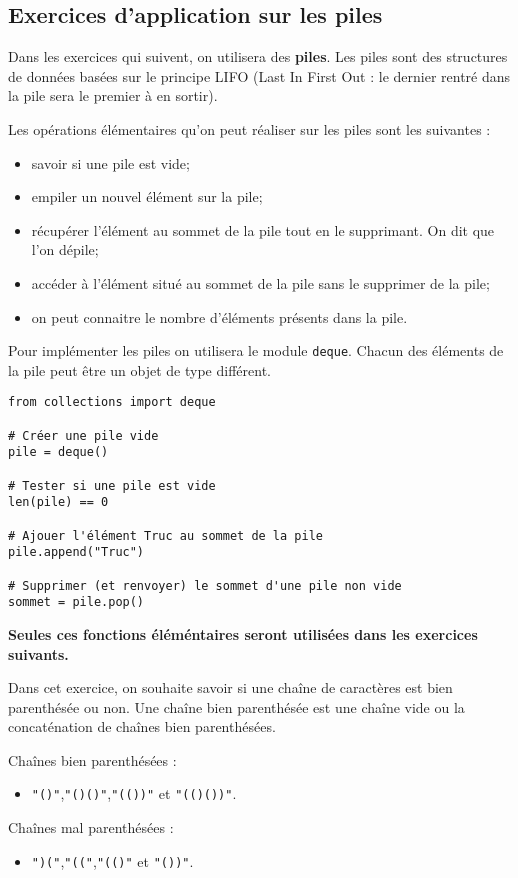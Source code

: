 \subsection*{Exercices d'application sur les piles}

Dans les exercices qui suivent, on utilisera des \textbf{piles}. Les piles sont des structures de données basées sur le principe LIFO (Last In First Out : le dernier rentré dans la pile sera le premier à en sortir).

Les opérations élémentaires qu'on peut réaliser sur les piles sont les suivantes : 
\begin{itemize}
\item savoir si une pile est vide; 
\item empiler un nouvel élément sur la pile;
\item récupérer l'élément au sommet de la pile tout en le supprimant. On dit que l'on dépile;
\item accéder à l'élément situé au sommet de la pile sans le supprimer de la pile;
\item on peut connaitre le nombre d'éléments présents dans la pile.
\end{itemize}

Pour implémenter les piles on utilisera le module \texttt{deque}. Chacun des éléments de la pile peut être un objet de type différent.

\begin{lstlisting} 
from collections import deque

# Créer une pile vide
pile = deque() 

# Tester si une pile est vide
len(pile) == 0

# Ajouer l'élément Truc au sommet de la pile
pile.append("Truc")

# Supprimer (et renvoyer) le sommet d'une pile non vide
sommet = pile.pop()
\end{lstlisting}


\textbf{Seules ces fonctions éléméntaires seront utilisées dans les exercices suivants.}

Dans cet exercice, on souhaite savoir si une chaîne de caractères est bien parenthésée ou non. 
Une chaîne bien parenthésée est une chaîne vide ou la concaténation de chaînes bien parenthésées. 
\begin{exemple}
Chaînes bien parenthésées :
\begin{itemize}
\item \texttt{"()"},\texttt{"()()"},\texttt{"(())"} et \texttt{"(()())"}.
\end{itemize}
Chaînes mal parenthésées :
\begin{itemize}
\item \texttt{")("},\texttt{"(("},\texttt{"(()"} et \texttt{"())"}.
\end{itemize}
\end{exemple} 

